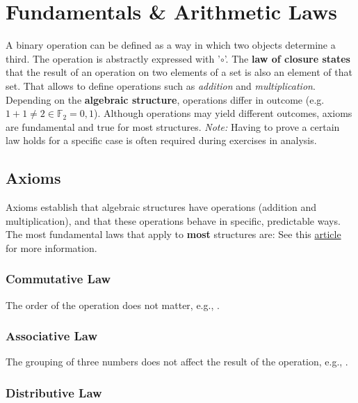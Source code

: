 \chapter{Fundamentals \& Arithmetic Laws}\label{Fundamental Arithmetic Laws}

A binary operation can be defined as a way in which two objects determine a third. The operation is abstractly expressed with '$\circ$'. The \textbf{law of closure states} that the result of an operation on two elements of a set is also an element of that set. That allows to define operations such as \textit{addition} and \textit{multiplication}.
Depending on the \textbf{algebraic structure}, operations differ in outcome (e.g. $1 +1 \neq 2 \in \mathbb{F}_{2} = {0,1}$). 
Although operations may yield different outcomes, axioms are fundamental and true for most structures. \textit{Note:} Having to prove a certain law holds for a specific case is often required during exercises in analysis.

\section{Axioms}\label{Axioms}
Axioms establish that algebraic structures have operations (addition and multiplication), and that these operations behave in specific, predictable ways. The most fundamental laws that apply to \textbf{most} structures are:
See this \href{https://math.libretexts.org/Bookshelves/Analysis/Mathematical_Analysis_(Zakon)/02%3A_Real_Numbers_and_Fields/2.01%3A_Axioms_and_Basic_Definitions}{article} for more information.

\subsection{Commutative Law}\label{Commutative Law}

The order of the operation does not matter, e.g., 
.

\subsection{Associative Law}\label{Associative Law}

The grouping of three numbers does not affect the result of the operation, e.g., 
.

\subsection{Distributive Law}\label{Distributive Law}

